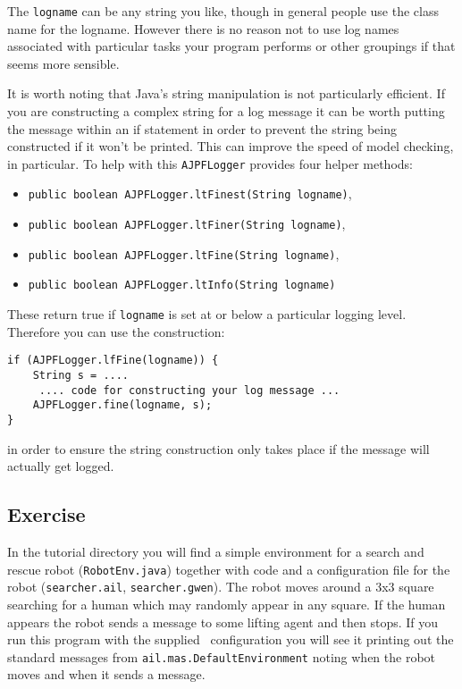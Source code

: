 The \texttt{logname} can be any string you like, though in general people use the class name for the logname.  However there is no reason not to use log names associated with particular tasks your program performs or other groupings if that seems more sensible.

It is worth noting that Java's string manipulation is not particularly efficient.  If you are constructing a complex string for a log message it can be worth putting the message within an if statement in order to prevent the string being constructed if it won't be printed.  This can improve the speed of model checking, in particular.  To help with this \texttt{AJPFLogger} provides four helper methods:
\begin{itemize}
\item  \texttt{public boolean AJPFLogger.ltFinest(String logname)}, 
\item \texttt{public boolean AJPFLogger.ltFiner(String logname)}, 
\item \texttt{public boolean AJPFLogger.ltFine(String logname)}, 
\item \texttt{public boolean AJPFLogger.ltInfo(String logname)} 
\end{itemize}
These return true if \texttt{logname} is set at or below a particular logging level.  Therefore you can use the construction:

\begin{verbatim}
if (AJPFLogger.lfFine(logname)) {
    String s = ....
     .... code for constructing your log message ...
    AJPFLogger.fine(logname, s);
}
\end{verbatim}
in order to ensure the string construction only takes place if the message will actually get logged.

\subsection{Exercise}
In the tutorial directory you will find a simple environment for a search and rescue robot (\texttt{RobotEnv.java}) together with code and a configuration file for the robot (\texttt{searcher.ail}, \texttt{searcher.gwen}).  The robot moves around a 3x3 square searching for a human which may randomly appear in any square.  If the human appears the robot sends a message to some lifting agent and then stops.  If you run this program with the supplied \ail\ configuration you will see it printing out the standard messages from \texttt{ail.mas.DefaultEnvironment} noting when the robot moves and when it sends a message.

